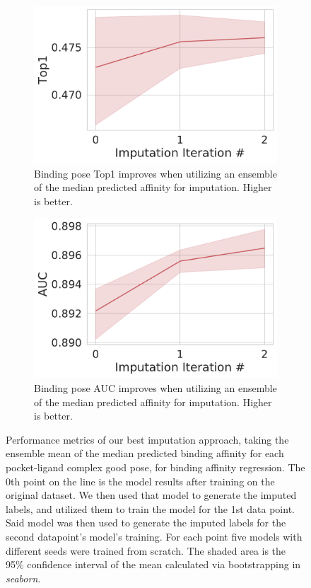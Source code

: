 \documentclass[journal=jcim,manuscript=article]{achemso}
\begin{document}
\begin{figure}[tbph]
    \begin{subfigure}[t]{0.48\textwidth}
        \centering
        \includegraphics[width=\linewidth]{figures/MedGOEnsTop1.pdf}
        \caption{Binding pose Top1 improves when utilizing an ensemble of the median predicted affinity for imputation. Higher is better.}
    \end{subfigure}
    \hfill
    \begin{subfigure}[t]{0.48\textwidth}
        \centering
        \includegraphics[width=\linewidth]{figures/MedGOEnsAUC.pdf}
        \caption{Binding pose AUC improves when utilizing an ensemble of the median predicted affinity for imputation. Higher is better.}
    \end{subfigure}
    \caption{Performance metrics of our best imputation approach, taking the ensemble mean of the median predicted binding affinity for each pocket-ligand complex good pose, for binding affinity regression. The 0th point on the line is the model results after training on the original dataset. We then used that model to generate the imputed labels, and utilized them to train the model for the 1st data point. Said model was then used to generate the imputed labels for the second datapoint's model's training. For each point five models with different seeds were trained from scratch. The shaded area is the 95\% confidence interval of the mean calculated via bootstrapping in \textit{seaborn}.}
    \label{fig:medGOEnsOverall}
\end{figure}
\end{document}
